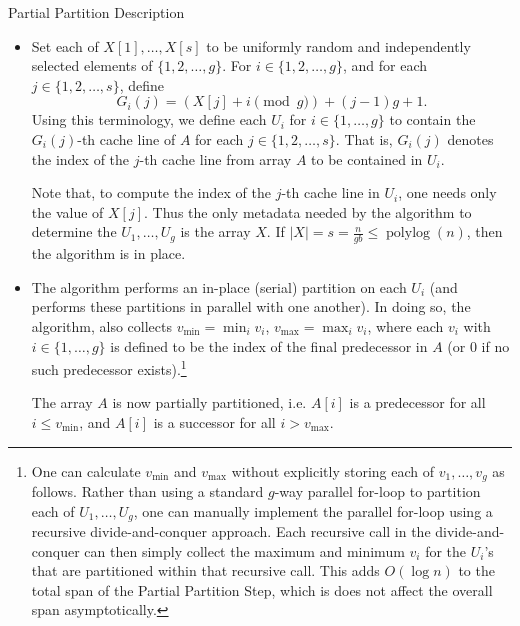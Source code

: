 \documentclass{beamer}
\begin{document}
\begin{frame}[t]{Partial Partition Description}
	\begin{itemize}
\item Set each of $X[1], \ldots, X[s]$ to be uniformly random and
  independently selected elements of $\{1, 2, \ldots, g\}$. For
  $i \in \{1, 2, \ldots, g\}$, and for each $j \in \{1, 2,
  \ldots, s\}$, define
  $$G_i(j) = (X[j] + i \pmod g) + (j - 1)g + 1.$$ Using this
  terminology, we define each $U_i$ for $i \in \{1, \ldots, g\}$ to
  contain the $G_i(j)$-th cache line of $A$ for each $j \in \{1, 2,
  \ldots, s\}$. That is, $G_i(j)$ denotes the index of the $j$-th
  cache line from array $A$ to be contained in $U_i$.

  Note that, to compute the index of the $j$-th cache line in $U_i$,
  one needs only the value of $X[j]$. Thus the only metadata needed by
  the algorithm to determine the $U_1, \ldots, U_g$ is the array
  $X$. If $|X| = s = \frac{n}{gb} \le \operatorname{polylog}(n)$, then
  the algorithm is in place.
  
\item The algorithm performs an in-place (serial) partition on each
  $U_i$ (and performs these partitions in parallel with one
  another). In doing so, the algorithm, also collects
  $v_{\text{min}}=\min_i{v_i}$, $v_{\text{max}}=\max_i{v_i}$, where
	each $v_i$ with $i \in \{1, \ldots, g\}$ is defined to be the index
  of the final predecessor in $A$ (or $0$ if no such predecessor
  exists).\footnote{One can calculate $v_{\text{min}}$ and
    $v_{\text{max}}$ without explicitly storing each of $v_1, \ldots,
		v_{g}$ as follows. Rather than using a standard $g$-way parallel
		for-loop to partition each of $U_1, \ldots, U_{g}$, one can
    manually implement the parallel for-loop using a recursive
    divide-and-conquer approach. Each recursive call in the
    divide-and-conquer can then simply collect the maximum and minimum
    $v_i$ for the $U_i$'s that are partitioned within that recursive
    call. This adds $O(\log n)$ to the total span of the Partial
    Partition Step, which is does not affect the overall span
    asymptotically. %
  }
  
  The array $A$ is now partially partitioned, i.e. $A[i]$ is a
  predecessor for all $i \le v_{\text{min}}$, and $A[i]$ is a successor
  for all $i > v_{\text{max}}$.
\end{itemize}

\end{frame}
\end{document}

